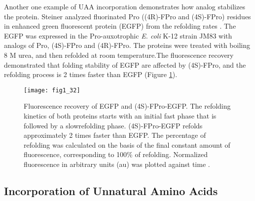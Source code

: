 \begin{refsection}
Another one example of UAA incorporation demonstrates how analog stabilizes the
protein. Steiner  analyzed fluorinated Pro ((4R)-FPro and
(4S)-FPro) residues in enhanced green fluorescent protein (EGFP) from the
refolding rates \cite{Steiner2008}. The EGFP was expressed in the
Pro-auxotrophic \emph{E. coli} K-12 strain JM83 with analogs of Pro, (4S)-FPro
and (4R)-FPro. The proteins were treated with boiling 8 M urea, and then
refolded at room temperature.The fluorescence recovery demonstrated that
folding stability of EGFP are affected by (4S)-FPro, and the refolding process
is 2 times faster than EGFP (Figure \ref{fig:budisa}).
\begin{figure}[htbp] \centering \texttt{[image: fig1\_32]} 
    \caption[Fluorescence recovery of EGFP and (4S)-FPro-EGFP. The refolding
    kinetics of both proteins starts with an initial fast phase that is
followed by a slowrefolding phase. (4S)-FPro-EGFP refolds approximately 2 times
faster than EGFP. The percentage of refolding was calculated on the basis of
the final constant amount of fluorescence, corresponding to 100\% of refolding.
Normalized fluorescence in arbitrary units (au) was plotted against
time.]{Fluorescence recovery of EGFP and (4S)-FPro-EGFP. The refolding kinetics
    of both proteins starts with an initial fast phase that is followed by a
    slowrefolding phase. (4S)-FPro-EGFP refolds approximately 2 times faster
    than EGFP. The percentage of refolding was calculated on the basis of the
    final constant amount of fluorescence, corresponding to 100\% of refolding.
    Normalized fluorescence in arbitrary units (au) was plotted against time
    \cite{Steiner2008}.}
    \label{fig:budisa}
\end{figure}

\subsection{Incorporation of Unnatural Amino Acids} 
\label{sec:rsi-intro}


\end{refsection}
